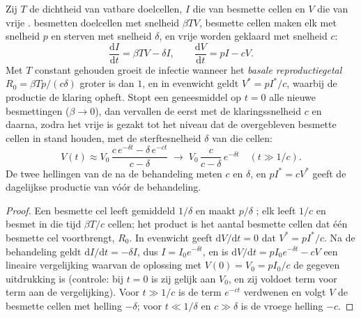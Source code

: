 \begin{theorem}\label{thm:b3:virology:dynamics}
Zij $T$ de dichtheid van vatbare doelcellen, $I$ die van besmette cellen
en $V$ die van vrije .  besmetten doelcellen met
snelheid $\beta TV$, besmette cellen maken elk  met snelheid
$p$ en sterven met snelheid $\delta$, en vrije  worden
geklaard met snelheid $c$:
\[
\frac{\mathrm{d}I}{\mathrm{d}t} = \beta TV - \delta I, \qquad
\frac{\mathrm{d}V}{\mathrm{d}t} = pI - cV .
\]
Met $T$ constant gehouden groeit de infectie wanneer het \emph{basale
reproductiegetal} $R_{0} = \beta Tp/(c\delta)$ groter is dan $1$, en in
evenwicht geldt $V^{*} = p I^{*}/c$, waarbij de productie de klaring
opheft. Stopt een geneesmiddel op $t = 0$ alle nieuwe besmettingen
($\beta \to 0$), dan vervallen de  eerst met de klaringssnelheid
$c$ en daarna, zodra het vrije  is gezakt tot het niveau dat de
overgebleven besmette cellen in stand houden, met de sterftesnelheid
$\delta$ van die cellen:
\[
V(t) \approx V_{0}\,\frac{c\,e^{-\delta t} - \delta\,e^{-ct}}{c - \delta}
\;\longrightarrow\; V_{0}\,\frac{c}{c-\delta}\,e^{-\delta t}
\quad (t \gg 1/c).
\]
De twee hellingen van de  na de behandeling meten $c$ en
$\delta$, en $pI^{*} = cV^{*}$ geeft de dagelijkse productie van
 vóór de behandeling.
\end{theorem}
\begin{proof}
Een besmette cel leeft gemiddeld $1/\delta$ en maakt $p/\delta$
; elk  leeft $1/c$ en besmet in die tijd $\beta T/c$
cellen; het product is het aantal besmette cellen dat één besmette cel
voortbrengt, $R_{0}$. In evenwicht geeft $\mathrm{d}V/\mathrm{d}t = 0$
dat $V^{*} = pI^{*}/c$. Na de behandeling geldt
$\mathrm{d}I/\mathrm{d}t =
-\delta I$, dus $I = I_{0}e^{-\delta t}$, en is
$\mathrm{d}V/\mathrm{d}t =
pI_{0}e^{-\delta t} - cV$ een lineaire vergelijking waarvan de
oplossing met $V(0) = V_{0} = pI_{0}/c$ de gegeven uitdrukking is
(controle: bij $t = 0$ is zij gelijk aan $V_{0}$, en zij voldoet term
voor term aan de vergelijking). Voor $t
\gg 1/c$ is de term $e^{-ct}$ verdwenen en volgt $V$ de besmette cellen
met helling $-\delta$; voor $t \ll 1/\delta$ en $c \gg \delta$ is de
vroege helling $-c$.
\end{proof}

